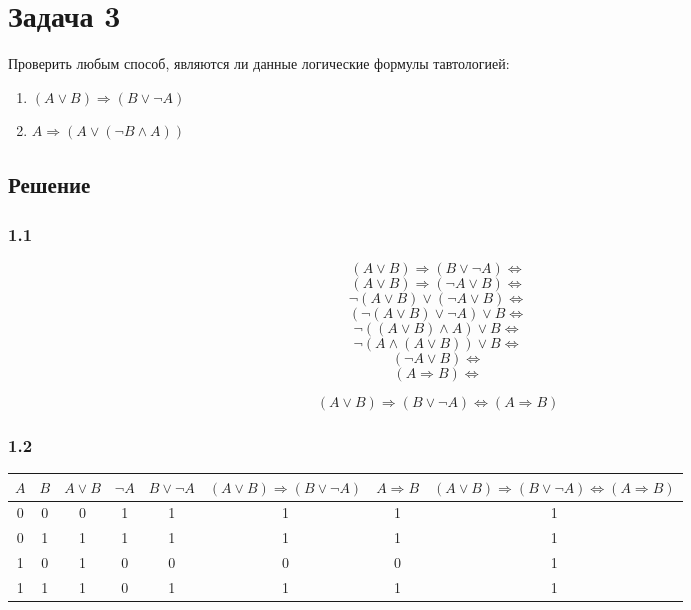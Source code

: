 \section*{Задача 3}

Проверить любым способ,
являются ли данные логические формулы тавтологией:

\begin{enumerate}
  \item \((A \vee B) \Rightarrow (B \vee \neg A)\)
  \item \(A \Rightarrow  (A \vee (\neg B \wedge A))\)
\end{enumerate}

\subsection*{Решение}

\subsubsection*{1.1}

\[(A \vee B) \Rightarrow (B \vee \neg A) \Leftrightarrow\]
\[(A \vee B) \Rightarrow (\neg A \vee B) \Leftrightarrow\]
\[\neg (A \vee B) \vee (\neg A \vee B) \Leftrightarrow\]
\[(\neg (A \vee B) \vee \neg A) \vee B \Leftrightarrow\]
\[\neg ((A \vee B) \wedge A) \vee B \Leftrightarrow\]
\[\neg (A \wedge (A \vee B)) \vee B \Leftrightarrow\]
\[(\neg A \vee B) \Leftrightarrow\]
\[(A \Rightarrow B) \Leftrightarrow\]

\[(A \vee B) \Rightarrow (B \vee \neg A) \Leftrightarrow (A \Rightarrow B)\]

\subsubsection*{1.2}

\begin{center}
  \begin{tabular}{c c | c c c c | c | c}
     \(A\) &
     \(B\) &
     \(A \vee B\) &
     \(\neg A\) &
     \(B \vee \neg A\) &
     \((A \vee B) \Rightarrow (B \vee \neg A)\) & 
     \(A \Rightarrow B\) & 
     \((A \vee B) \Rightarrow (B \vee \neg A) \Leftrightarrow (A \Rightarrow B)\) \\
     \hline
     0 & 0 & 0 & 1 & 1 & 1 & 1 & 1 \\
     0 & 1 & 1 & 1 & 1 & 1 & 1 & 1 \\
     1 & 0 & 1 & 0 & 0 & 0 & 0 & 1 \\
     1 & 1 & 1 & 0 & 1 & 1 & 1 & 1
  \end{tabular}
\end{center}

